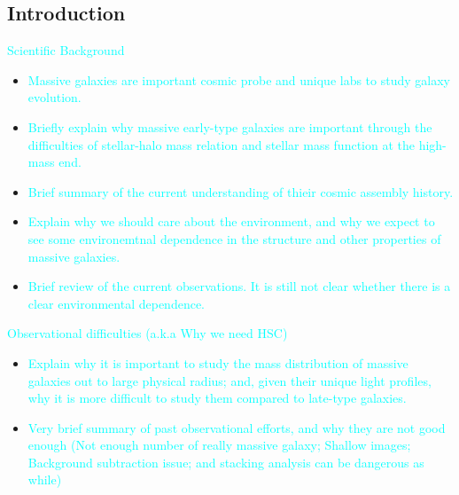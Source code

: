\documentclass[preprint]{aastex}
\newcommand{\plan}[1]{\textcolor{cyan}{#1}}
\begin{document}
\begin{CJK*}{UTF8}{gbsn}
\maketitle


\section{Introduction}

    \plan{Scientific Background}
    \begin{itemize}
        \item \plan{Massive galaxies are important cosmic probe and unique labs to study 
            galaxy evolution.} 
        \item \plan{Briefly explain why massive early-type galaxies are important through 
            the difficulties of stellar-halo mass relation and stellar mass function at the 
            high-mass end.}
        \item \plan{Brief summary of the current understanding of thieir cosmic assembly 
            history.}
        \item \plan{Explain why we should care about the environment, and why we expect to 
            see some environemtnal dependence in the structure and other properties of
            massive galaxies.}
        \item \plan{Brief review of the current observations.  It is still not clear 
            whether there is a clear environmental dependence.}
    \end{itemize}

    \plan{Observational difficulties (a.k.a Why we need HSC)}
    \begin{itemize}
        \item \plan{Explain why it is important to study the mass distribution of 
            massive galaxies out to large physical radius; and, given their unique light 
            profiles, why it is more difficult to study them compared to late-type 
            galaxies.}
        \item \plan{Very brief summary of past observational efforts, and why they are not 
            good enough (Not enough number of really massive galaxy; Shallow images; 
            Background subtraction issue; and stacking analysis can be dangerous as while)}
    \end{itemize}
    

\end{CJK*}
\end{document}
